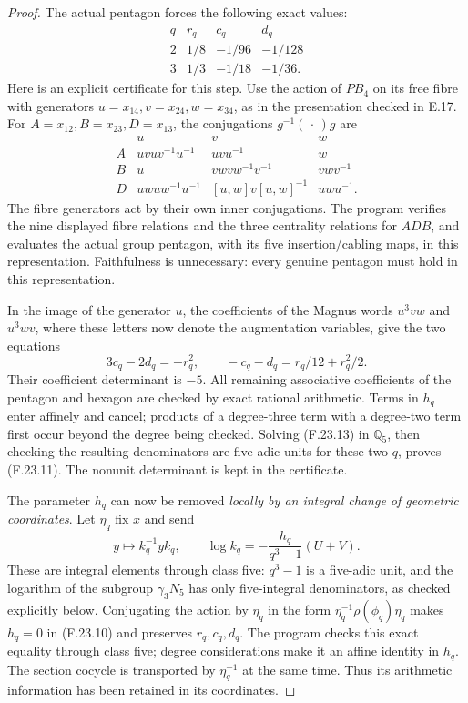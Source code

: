 \begin{proof}
The actual pentagon forces the following exact values:
\[
\begin{array}{c|rrr}
 q&r_q&c_q&d_q\\ \hline
 2&1/8&-1/96&-1/128\\
 3&1/3&-1/18&-1/36.
\end{array}                                                     \tag{F.23.11}
\]
Here is an explicit certificate for this step.
Use the action of \(PB_4\) on its free fibre with generators
\(u=x_{14},v=x_{24},w=x_{34}\), as in the presentation
checked in E.17. For \(A=x_{12},B=x_{23},D=x_{13}\),
the conjugations \(g^{-1}(\,\cdot\,)g\) are
\[
\begin{array}{c|ccc}
 &u&v&w\\ \hline
 A&uvu v^{-1}u^{-1}&uvu^{-1}&w\\
 B&u&vwv w^{-1}v^{-1}&vwv^{-1}\\
 D&uwu w^{-1}u^{-1}&[u,w]v[u,w]^{-1}&uwu^{-1}.
\end{array}                                                     \tag{F.23.12}
\]
The fibre generators act by their own inner conjugations.
The program verifies the nine displayed fibre relations
and the three centrality relations for \(ADB\), and
evaluates the actual group pentagon, with its five
insertion/cabling maps, in this representation.
Faithfulness is unnecessary: every genuine pentagon
must hold in this representation.

In the image of the generator \(u\), the coefficients
of the Magnus words \(u^3vw\) and \(u^3wv\), where these
letters now denote the augmentation variables, give
the two equations
\[
 3c_q-2d_q=-r_q^2,\qquad
       -c_q-d_q=r_q/12+r_q^2/2.                              \tag{F.23.13}
\]
Their coefficient determinant is \(-5\).
All remaining associative coefficients of the pentagon
and hexagon are checked by exact rational arithmetic.
Terms in \(h_q\) enter affinely and cancel; products of
a degree-three term with a degree-two term first occur
beyond the degree being checked. Solving (F.23.13) in
\(\mathbb Q_5\), then checking the resulting denominators
are five-adic units for these two \(q\), proves (F.23.11).
The nonunit determinant is kept in the certificate.

The parameter \(h_q\) can now be removed \emph{locally by
an integral change of geometric coordinates}.
Let \(\eta_q\) fix \(x\) and send
\[
 y\longmapsto k_q^{-1}yk_q,\qquad
 \log k_q=-\frac{h_q}{q^3-1}(U+V).
                                                               \tag{F.23.14}
\]
These are integral elements through class five:
\(q^3-1\) is a five-adic unit, and the logarithm of the
subgroup \(\gamma_3N_5\) has only five-integral
denominators, as checked explicitly below.
Conjugating the action by \(\eta_q\) in the form
\(\eta_q^{-1}\rho(\phi_q)\eta_q\) makes \(h_q=0\) in
(F.23.10) and preserves \(r_q,c_q,d_q\).
The program checks this exact equality through class
five; degree considerations make it an affine identity
in \(h_q\). The section cocycle is transported by
\(\eta_q^{-1}\) at the same time. Thus its arithmetic
information has been retained in its coordinates.


\end{proof}
